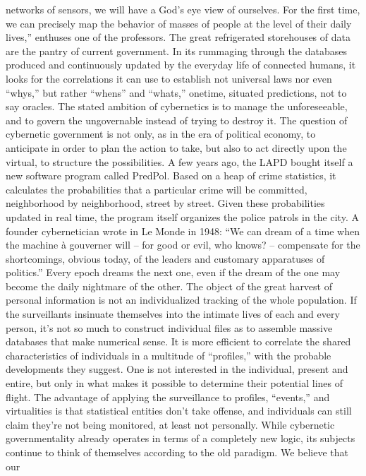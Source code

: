 \documentclass[landscape,twocolumn,letterpaper]{article}
\begin{document}
networks of sensors, we will have a God’s eye view of ourselves. For
the first time, we can precisely map the behavior of masses of people
at the level of their daily lives,” enthuses one of the
professors. The great refrigerated storehouses of data are the pantry
of current government. In its rummaging through the databases produced
and continuously updated by the everyday life of connected humans, it
looks for the correlations it can use to establish not universal laws
nor even “whys,” but rather “whens” and “whats,” onetime, situated
predictions, not to say oracles. The stated ambition of cybernetics is
to manage the unforeseeable, and to govern the ungovernable instead of
trying to destroy it. The question of cybernetic government is not
only, as in the era of political economy, to anticipate in order to
plan the action to take, but also to act directly upon the virtual, to
structure the possibilities. A few years ago, the LAPD bought itself a
new software program called PredPol. Based on a heap of crime
statistics, it calculates the probabilities that a particular crime
will be committed, neighborhood by neighborhood, street by
street. Given these probabilities updated in real time, the program
itself organizes the police patrols in the city. A founder
cybernetician wrote in Le Monde in 1948: “We can dream of a time when
the machine à gouverner will – for good or evil, who knows?  –
compensate for the shortcomings, obvious today, of the leaders and
customary apparatuses of politics.” Every epoch dreams the next one,
even if the dream of the one may become the daily nightmare of the
other. The object of the great harvest of personal information is not
an individualized tracking of the whole population. If the
surveillants insinuate themselves into the intimate lives of each and
every person, it’s not so much to construct individual files as to
assemble massive databases that make numerical sense. It is more
efficient to correlate the shared characteristics of individuals in a
multitude of “profiles,” with the probable developments they
suggest. One is not interested in the individual, present and entire,
but only in what makes it possible to determine their potential lines
of flight. The advantage of applying the surveillance to profiles,
“events,” and virtualities is that statistical entities don’t take
offense, and individuals can still claim they’re not being monitored,
at least not personally. While cybernetic governmentality already
operates in terms of a completely new logic, its subjects continue to
think of themselves according to the old paradigm. We believe that our
\end{document}
